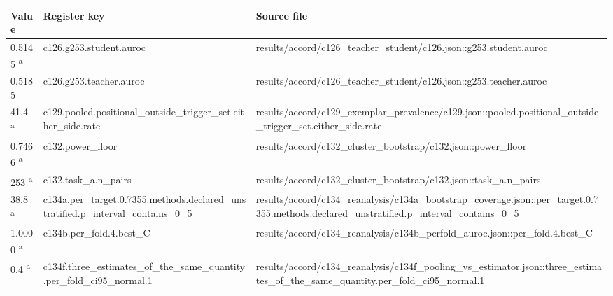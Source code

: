 \singlespacing
\begin{longtable}{@{}p{0.7in}p{1.9in}p{2.6in}@{}}
\textbf{Value} & \textbf{Register key} & \textbf{Source file}\\
\midrule
\endhead
0.5145 \textsuperscript{a} & c126.\allowbreak{}g253.\allowbreak{}student.\allowbreak{}auroc & results/\allowbreak{}accord/\allowbreak{}c126\_teacher\_student/\allowbreak{}c126.\allowbreak{}json::g253.\allowbreak{}student.\allowbreak{}auroc\\
0.5185 & c126.\allowbreak{}g253.\allowbreak{}teacher.\allowbreak{}auroc & results/\allowbreak{}accord/\allowbreak{}c126\_teacher\_student/\allowbreak{}c126.\allowbreak{}json::g253.\allowbreak{}teacher.\allowbreak{}auroc\\
41.4 \textsuperscript{a} & c129.\allowbreak{}pooled.\allowbreak{}positional\_outside\_trigger\_set.\allowbreak{}either\_side.\allowbreak{}rate & results/\allowbreak{}accord/\allowbreak{}c129\_exemplar\_prevalence/\allowbreak{}c129.\allowbreak{}json::pooled.\allowbreak{}positional\_outside\_trigger\_set.\allowbreak{}either\_side.\allowbreak{}rate\\
0.7466 \textsuperscript{a} & c132.\allowbreak{}power\_floor & results/\allowbreak{}accord/\allowbreak{}c132\_cluster\_bootstrap/\allowbreak{}c132.\allowbreak{}json::power\_floor\\
253 \textsuperscript{a} & c132.\allowbreak{}task\_a.\allowbreak{}n\_pairs & results/\allowbreak{}accord/\allowbreak{}c132\_cluster\_bootstrap/\allowbreak{}c132.\allowbreak{}json::task\_a.\allowbreak{}n\_pairs\\
38.8 \textsuperscript{a} & c134a.\allowbreak{}per\_target.\allowbreak{}0.\allowbreak{}7355.\allowbreak{}methods.\allowbreak{}declared\_unstratified.\allowbreak{}p\_interval\_contains\_0\_5 & results/\allowbreak{}accord/\allowbreak{}c134\_reanalysis/\allowbreak{}c134a\_bootstrap\_coverage.\allowbreak{}json::per\_target.\allowbreak{}0.\allowbreak{}7355.\allowbreak{}methods.\allowbreak{}declared\_unstratified.\allowbreak{}p\_interval\_contains\_0\_5\\
1.0000 \textsuperscript{a} & c134b.\allowbreak{}per\_fold.\allowbreak{}4.\allowbreak{}best\_C & results/\allowbreak{}accord/\allowbreak{}c134\_reanalysis/\allowbreak{}c134b\_perfold\_auroc.\allowbreak{}json::per\_fold.\allowbreak{}4.\allowbreak{}best\_C\\
0.4 \textsuperscript{a} & c134f.\allowbreak{}three\_estimates\_of\_the\_same\_quantity.\allowbreak{}per\_fold\_ci95\_normal.\allowbreak{}1 & results/\allowbreak{}accord/\allowbreak{}c134\_reanalysis/\allowbreak{}c134f\_pooling\_vs\_estimator.\allowbreak{}json::three\_estimates\_of\_the\_same\_quantity.\allowbreak{}per\_fold\_ci95\_normal.\allowbreak{}1\\

\end{longtable}

